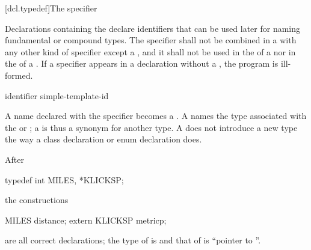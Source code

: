 [dcl.typedef]{The  specifier}%

\pnum
Declarations containing the  
declare identifiers that can be used later for naming
fundamental or compound
types. The  specifier shall not be
combined in a  with any other kind of
specifier except a , and it shall not be used in the
 of a
 nor in the
 of a
.
If a  specifier appears in a declaration without a ,
the program is ill-formed.

\begin{bnf}
\br
    identifier\br
    simple-template-id
\end{bnf}

A name declared with the  specifier becomes a
.
A  names
the type associated with the 
or ;
%
%
%
a  is thus a synonym for another type. A
 does not introduce a new type the way a class
declaration or enum declaration does.
\begin{example}
After
\begin{codeblock}
typedef int MILES, *KLICKSP;
\end{codeblock}
the constructions
\begin{codeblock}
MILES distance;
extern KLICKSP metricp;
\end{codeblock}
are all correct declarations; the type of  is
 and that of  is ``pointer to ''.
\end{example}

